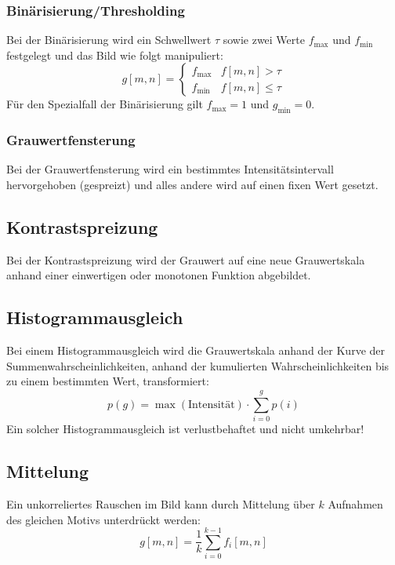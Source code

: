 		\subsubsection{Binärisierung/Thresholding}
			Bei der Binärisierung wird ein Schwellwert \(\tau\) sowie zwei Werte \(f_\text{max}\) und \(f_\text{min}\) festgelegt und das Bild wie folgt manipuliert:
			\begin{equation*}
				g[m, n] =
				\begin{cases}
					f_\text{max} & f[m, n] > \tau    \\
					f_\text{min} & f[m, n] \leq \tau
				\end{cases}
			\end{equation*}
			Für den Spezialfall der Binärisierung gilt \( f_\text{max} = 1 \) und \( g_\text{min} = 0 \).

		\subsubsection{Grauwertfensterung}
			Bei der Grauwertfensterung wird ein bestimmtes Intensitätsintervall hervorgehoben (gespreizt) und alles andere wird auf einen fixen Wert gesetzt.

		\subsection{Kontrastspreizung}
			Bei der Kontrastspreizung wird der Grauwert auf eine neue Grauwertskala anhand einer einwertigen oder monotonen Funktion abgebildet.

		\subsection{Histogrammausgleich}
			Bei einem Histogrammausgleich wird die Grauwertskala anhand der Kurve der Summenwahrscheinlichkeiten, \dh anhand der kumulierten Wahrscheinlichkeiten bis zu einem bestimmten Wert, transformiert:
			\begin{equation*}
				p(g) = \max(\text{Intensität}) \cdot \sum_{i = 0}^{g} p(i)
			\end{equation*}
			Ein solcher Histogrammausgleich ist verlustbehaftet und nicht umkehrbar!

		\subsection{Mittelung}
			Ein unkorreliertes Rauschen im Bild kann durch Mittelung über \(k\) Aufnahmen des gleichen Motivs unterdrückt werden:
			\begin{equation*}
				g[m, n] = \frac{1}{k} \sum_{i = 0}^{k - 1} f_i[m, n]
			\end{equation*}

